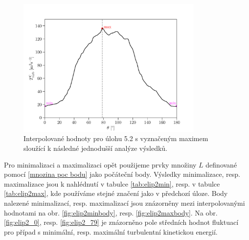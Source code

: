 \begin{figure}[H]
	\centering
	\vspace{-2mm}
	\includegraphics[width=0.82\textwidth]{Images/elip2interpolated.pdf}
	\vspace{2mm}
	\caption{Interpolované hodnoty pro úlohu 5.2 s vyznačeným maximem sloužící k následné jednodušší analýze výsledků.}
	\label{fig:interpolovana elipsa 2}
	\vspace{1.8mm}
\end{figure}

Pro minimalizaci a maximalizaci opět použijeme prvky množiny $ L $ definované pomocí \eqref{mnozina poc bodu} jako počáteční body. Výsledky minimalizace, resp. maximalizace jsou k nahlédnutí v tabulce \ref{tab:elip2min}, resp. v tabulce \ref{tab:elip2max}, kde používáme stejné značení jako v předchozí úloze. Body nalezené minimalizací, resp. maximalizací jsou znázorněny mezi interpolovanými hodnotami na obr. \ref{fig:elip2minbody}, resp. \ref{fig:elip2maxbody}. Na obr. \ref{fig:elip2_0}, resp. \ref{fig:elip2_79} je znázorněno pole středních hodnot fluktuací pro případ s minimální, resp. maximální turbulentní kinetickou energií.

